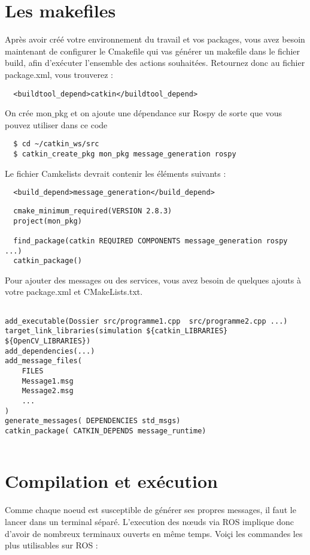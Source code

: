 \documentclass[a4paper,french, titlepage]{book}
\begin{document}
\section{Les makefiles}

Après avoir créé votre environnement du travail et vos packages, vous avez besoin maintenant de configurer le Cmakefile qui vas générer un makefile dans le fichier build, afin d'exécuter l'ensemble des actions souhaitées. Retournez donc au fichier package.xml, vous trouverez :

\begin{Verbatim}
  <buildtool_depend>catkin</buildtool_depend>
\end{Verbatim}  

On crée  mon$\_$pkg et on ajoute une dépendance sur Rospy de sorte que vous pouvez utiliser dans ce code

\begin{Verbatim}  
  $ cd ~/catkin_ws/src
  $ catkin_create_pkg mon_pkg message_generation rospy
\end{Verbatim}  

Le fichier Camkelists devrait contenir les éléments suivants :

\begin{Verbatim} 
  <build_depend>message_generation</build_depend>
\end{Verbatim} 

\begin{Verbatim}  
  cmake_minimum_required(VERSION 2.8.3)
  project(mon_pkg)

  find_package(catkin REQUIRED COMPONENTS message_generation rospy ...)
  catkin_package()
\end{Verbatim}  

Pour ajouter des messages ou des services, vous avez besoin de quelques ajouts à votre package.xml et CMakeLists.txt.

\begin{Verbatim}

add_executable(Dossier src/programme1.cpp  src/programme2.cpp ...) 
target_link_libraries(simulation ${catkin_LIBRARIES} ${OpenCV_LIBRARIES})
add_dependencies(...)
add_message_files(
	FILES
	Message1.msg
	Message2.msg
	...
)
generate_messages( DEPENDENCIES std_msgs)
catkin_package( CATKIN_DEPENDS message_runtime)
 
\end{Verbatim}

\section{Compilation et exécution\label{annexe_ROS_compilation}}
Comme chaque noeud est susceptible de générer ses propres messages, il faut le lancer dans un terminal séparé. L'execution des nœuds via ROS implique donc d'avoir de nombreux terminaux ouverts en même temps. Voiçi les commandes les plus utilisables sur ROS : \\
\end{document}
